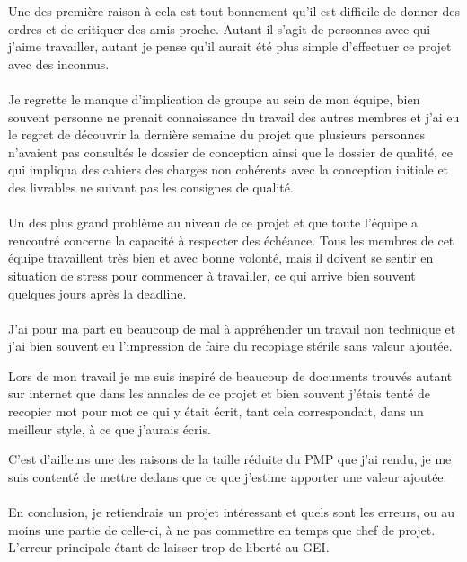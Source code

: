 \documentclass[a4paper, 11pt, draft]{article}
\begin{document}
Une des première raison à cela est tout bonnement qu'il est difficile de
donner des ordres et de critiquer des amis proche. Autant il s'agit de
personnes avec qui j'aime travailler, autant je pense qu'il aurait été plus
simple d'effectuer ce projet avec des inconnus.

\paragraph{}

Je regrette le manque d'implication de groupe au sein de mon équipe, bien
souvent personne ne prenait connaissance du travail des autres membres et
j'ai eu le regret de découvrir la dernière semaine du projet que plusieurs
personnes n'avaient pas consultés le dossier de conception ainsi que le
dossier de qualité, ce qui impliqua des cahiers des charges non cohérents
avec la conception initiale et des livrables ne suivant pas les consignes de
qualité.

\paragraph{}

Un des plus grand problème au niveau de ce projet et que toute l'équipe a
rencontré concerne la capacité à respecter des échéance. Tous les membres de
cet équipe travaillent très bien et avec bonne volonté, mais il doivent se
sentir en situation de stress pour commencer à travailler, ce qui arrive
bien souvent quelques jours après la deadline.

\paragraph{}

J'ai pour ma part eu beaucoup de mal à appréhender un travail non technique
et j'ai bien souvent eu l'impression de faire du recopiage stérile sans
valeur ajoutée.

Lors de mon travail je me suis inspiré de beaucoup de documents trouvés
autant sur internet que dans les annales de ce projet et bien souvent
j'étais tenté de recopier mot pour mot ce qui y était écrit, tant cela
correspondait, dans un meilleur style, à ce que j'aurais écris.

C'est d'ailleurs une des raisons de la taille réduite du PMP que j'ai rendu,
je me suis contenté de mettre dedans que ce que j'estime apporter une valeur
ajoutée.

\paragraph{}

En conclusion, je retiendrais un projet intéressant et quels sont les
erreurs, ou au moins une partie de celle-ci, à ne pas commettre en temps que
chef de projet. L'erreur principale étant de laisser trop de liberté au GEI.
\end{document}
